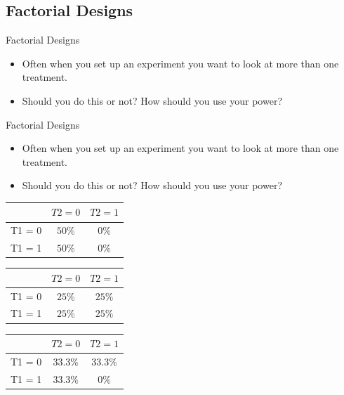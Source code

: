 \documentclass[
  11pt,
  ignorenonframetext,
]{beamer}
\providecommand{\tightlist}{%
  \setlength{\itemsep}{0pt}\setlength{\parskip}{0pt}}\usepackage{longtable,booktabs,array}
\begin{document}
\hypertarget{factorial-designs}{%
\subsection{Factorial Designs}\label{factorial-designs}}

\begin{frame}{Factorial Designs}
\protect\hypertarget{factorial-designs-1}{}
\begin{itemize}
\tightlist
\item
  Often when you set up an experiment you want to look at more than one
  treatment.
\item
  Should you do this or not? How should you use your power?
\end{itemize}
\end{frame}

\begin{frame}{Factorial Designs}
\protect\hypertarget{factorial-designs-2}{}
\begin{itemize}
\tightlist
\item
  Often when you set up an experiment you want to look at more than one
  treatment.
\item
  Should you do this or not? How should you use your power?
\end{itemize}

\begin{table} 
\tiny
\begin{minipage}[b]{0.2\linewidth}\centering
    \begin{tabular}{c|cc}
    \footnotesize
        &               $T2=0$ & $T2=1$ \\ \hline 
    T1 = 0  &   $50\%$ & $0\%$ \\
    T1 = 1  &   $50\%$ &  $0\%$ \\
    \end{tabular}
\end{minipage}
\bigskip
\hspace{0.1cm}

\begin{minipage}[b]{0.2\linewidth}\centering
    \begin{tabular}{c|cc}
    \tiny
    &               $T2=0$ & $T2=1$ \\ \hline
    T1 = 0  &   $25\%$ & $25\%$ \\
    T1 = 1  &   $25\%$ &  $25\%$ \\
    \end{tabular}
\end{minipage}
\bigskip
\hspace{0.1cm}

\begin{minipage}[b]{0.2\linewidth}
    \centering
    \begin{tabular}{c|cc}
    \tiny
    &               $T2 = 0$ & $T2 = 1$ \\ \hline
    T1 = 0  &   $33.3\%$ & $33.3\%$ \\
    T1 = 1  &   $33.3\%$ &  $0\%$ \\
    \end{tabular}
    \end{minipage}
\end{table}
\end{frame}
\end{document}
